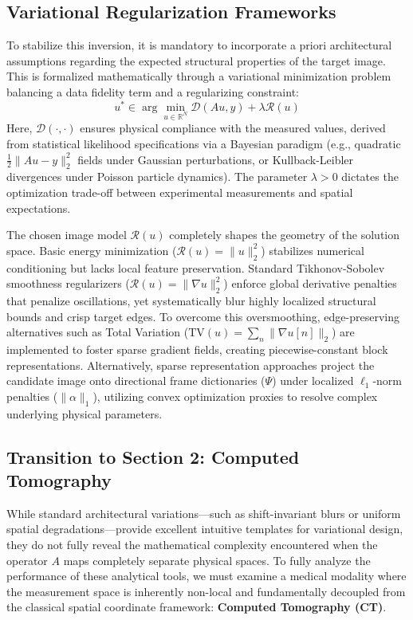 \subsection{Variational Regularization Frameworks}
To stabilize this inversion, it is mandatory to incorporate a priori architectural assumptions regarding the expected structural properties of the target image. This is formalized mathematically through a variational minimization problem balancing a data fidelity term and a regularizing constraint:
\begin{equation}
    u^* \in \arg\min_{u \in \mathbb{R}^N} \mathcal{D}(Au, y) + \lambda \mathcal{R}(u)
\end{equation}
Here, $\mathcal{D}(\cdot,\cdot)$ ensures physical compliance with the measured values, derived from statistical likelihood specifications via a Bayesian paradigm (e.g., quadratic $\frac{1}{2}\|Au-y\|_2^2$ fields under Gaussian perturbations, or Kullback-Leibler divergences under Poisson particle dynamics). The parameter $\lambda > 0$ dictates the optimization trade-off between experimental measurements and spatial expectations. 

The chosen image model $\mathcal{R}(u)$ completely shapes the geometry of the solution space. Basic energy minimization ($\mathcal{R}(u) = \|u\|_2^2$) stabilizes numerical conditioning but lacks local feature preservation. Standard Tikhonov-Sobolev smoothness regularizers ($\mathcal{R}(u) = \|\nabla u\|_2^2$) enforce global derivative penalties that penalize oscillations, yet systematically blur highly localized structural bounds and crisp target edges. To overcome this oversmoothing, edge-preserving alternatives such as Total Variation ($\text{TV}(u) = \sum_n \|\nabla u[n]\|_2$) are implemented to foster sparse gradient fields, creating piecewise-constant block representations. Alternatively, sparse representation approaches project the candidate image onto directional frame dictionaries ($\Psi$) under localized $\ell_1$-norm penalties ($\| \alpha \|_1$), utilizing convex optimization proxies to resolve complex underlying physical parameters.

\subsection{Transition to Section 2: Computed Tomography}
While standard architectural variations—such as shift-invariant blurs or uniform spatial degradations—provide excellent intuitive templates for variational design, they do not fully reveal the mathematical complexity encountered when the operator $A$ maps completely separate physical spaces. To fully analyze the performance of these analytical tools, we must examine a medical modality where the measurement space is inherently non-local and fundamentally decoupled from the classical spatial coordinate framework: \textbf{Computed Tomography (CT)}. 

